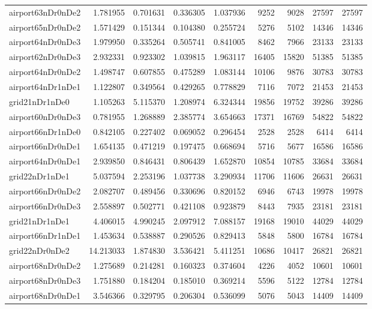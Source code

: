 \begin{longtable}{|l|r|r|r|r|r|r|r|r|}
airport63nDr0nDe2 & 1.781955 & 0.701631 & 0.336305 & 1.037936 & 9252 & 9028 & 27597 & 27597 \\
airport65nDr0nDe2 & 1.571429 & 0.151344 & 0.104380 & 0.255724 & 5276 & 5102 & 14346 & 14346 \\
airport64nDr0nDe3 & 1.979950 & 0.335264 & 0.505741 & 0.841005 & 8462 & 7966 & 23133 & 23133 \\
airport62nDr0nDe3 & 2.932331 & 0.923302 & 1.039815 & 1.963117 & 16405 & 15820 & 51385 & 51385 \\
airport64nDr0nDe2 & 1.498747 & 0.607855 & 0.475289 & 1.083144 & 10106 & 9876 & 30783 & 30783 \\
airport64nDr1nDe1 & 1.122807 & 0.349564 & 0.429265 & 0.778829 & 7116 & 7072 & 21453 & 21453 \\
grid21nDr1nDe0 & 1.105263 & 5.115370 & 1.208974 & 6.324344 & 19856 & 19752 & 39286 & 39286 \\
airport60nDr0nDe3 & 0.781955 & 1.268889 & 2.385774 & 3.654663 & 17371 & 16769 & 54822 & 54822 \\
airport66nDr1nDe0 & 0.842105 & 0.227402 & 0.069052 & 0.296454 & 2528 & 2528 & 6414 & 6414 \\
airport66nDr0nDe1 & 1.654135 & 0.471219 & 0.197475 & 0.668694 & 5716 & 5677 & 16586 & 16586 \\
airport64nDr0nDe1 & 2.939850 & 0.846431 & 0.806439 & 1.652870 & 10854 & 10785 & 33684 & 33684 \\
grid22nDr1nDe1 & 5.037594 & 2.253196 & 1.037738 & 3.290934 & 11706 & 11606 & 26631 & 26631 \\
airport66nDr0nDe2 & 2.082707 & 0.489456 & 0.330696 & 0.820152 & 6946 & 6743 & 19978 & 19978 \\
airport66nDr0nDe3 & 2.558897 & 0.502771 & 0.421108 & 0.923879 & 8443 & 7935 & 23181 & 23181 \\
grid21nDr1nDe1 & 4.406015 & 4.990245 & 2.097912 & 7.088157 & 19168 & 19010 & 44029 & 44029 \\
airport66nDr1nDe1 & 1.453634 & 0.538887 & 0.290526 & 0.829413 & 5848 & 5800 & 16784 & 16784 \\
grid22nDr0nDe2 & 14.213033 & 1.874830 & 3.536421 & 5.411251 & 10686 & 10417 & 26821 & 26821 \\
airport68nDr0nDe2 & 1.275689 & 0.214281 & 0.160323 & 0.374604 & 4226 & 4052 & 10601 & 10601 \\
airport68nDr0nDe3 & 1.751880 & 0.184204 & 0.185010 & 0.369214 & 5596 & 5122 & 12784 & 12784 \\
airport68nDr0nDe1 & 3.546366 & 0.329795 & 0.206304 & 0.536099 & 5076 & 5043 & 14409 & 14409 \\

\end{longtable}
